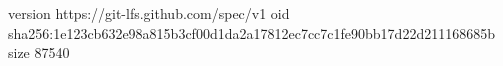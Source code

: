 version https://git-lfs.github.com/spec/v1
oid sha256:1e123cb632e98a815b3cf00d1da2a17812ec7cc7c1fe90bb17d22d211168685b
size 87540
